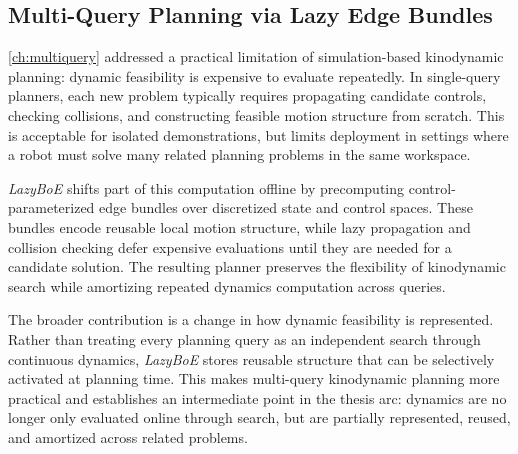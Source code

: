 \subsection{Multi-Query Planning via Lazy Edge Bundles}
\label{sec:discussion:multiquery}

\cref{ch:multiquery} addressed a practical limitation of simulation-based kinodynamic planning: dynamic feasibility is expensive to evaluate repeatedly.
In single-query planners, each new problem typically requires propagating candidate controls, checking collisions, and constructing feasible motion structure from scratch.
This is acceptable for isolated demonstrations, but limits deployment in settings where a robot must solve many related planning problems in the same workspace.

\textit{LazyBoE} shifts part of this computation offline by precomputing control-parameterized edge bundles over discretized state and control spaces.
These bundles encode reusable local motion structure, while lazy propagation and collision checking defer expensive evaluations until they are needed for a candidate solution.
The resulting planner preserves the flexibility of kinodynamic search while amortizing repeated dynamics computation across queries.

The broader contribution is a change in how dynamic feasibility is represented.
Rather than treating every planning query as an independent search through continuous dynamics, \textit{LazyBoE} stores reusable structure that can be selectively activated at planning time.
This makes multi-query kinodynamic planning more practical and establishes an intermediate point in the thesis arc: dynamics are no longer only evaluated online through search, but are partially represented, reused, and amortized across related problems.


